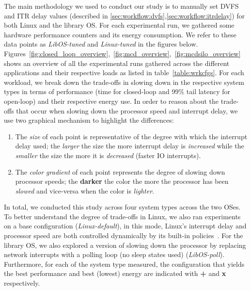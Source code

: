\label{sec:exp}
The main methodology we used to conduct our study is to manually set DVFS and ITR delay values (described in \cref{sec:workflow:dvfs},\cref{sec:workflow:itrdelay}) for both Linux and the library OS. For each experimental run, we gathered some hardware performance counters and its energy consumption. We refer to these data points as \textit{LibOS-tuned} and \textit{Linux-tuned} in the figures below. Figures~\ref{fig:closed_loop_overview},~\ref{fig:mcd_overview},~\ref{fig:mcdsilo_overview} shows an overview of all the experimental runs gathered across the different applications and their respective loads as listed in table~\ref{table:wrkcfgs}. For each workload, we break down the trade-offs in slowing down in the respective system types in terms of performance (time for closed-loop and 99\% tail latency for open-loop) and their respective energy use. In order to reason about the trade-offs that occur when slowing down the processor speed and interrupt delay, we use two graphical mechanism to highlight the differences: 
\begin{enumerate}
    \item The \textit{size} of each point is representative of the degree with which the interrupt delay used; the {\larger[1]\textit{larger}} the size the more interrupt delay is \textit{increased} while the \textit{smaller} the size the more it is \textit{decreased} (faster IO interrupts).
    \item The \textit{color gradient} of each point represents the degree of slowing down processor speeds; the \textbf{darker} the color the more the processor has been \textit{slowed} and vice-versa when the color is \textit{lighter}.
\end{enumerate}

In total, we conducted this study across four system types across the two OSes. To better understand the degree of trade-offs in Linux, we also ran experiments on a base configuration (\textit{Linux-default}), in this mode, Linux's interrupt delay and processor speed are both controlled dynamically by its built-in policies~\cite{cpufreq_governor,intelitr}. For the library OS, we also explored a version of slowing down the processor by replacing network interrupts with a polling loop (no sleep states used) (\textit{LibOS-poll}). Furthermore, for each of the system type measured, the configuration that yields the best performance and best (lowest) energy are indicated with {\larger[4]\textbf{+}} and {\larger[4]\textbf{x}} respectively.